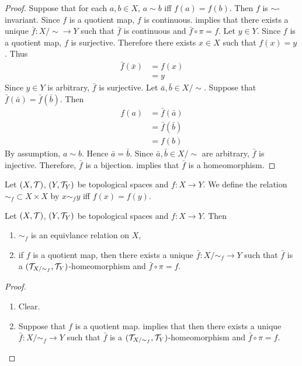 \documentclass{book}
\begin{document}
	\begin{proof}
		Suppose that for each $a, b \in X$, $a \sim b$ iff $f(a) = f(b)$. Then $f$ is ${\sim}$-invariant. Since $f$ is a quotient map, $f$ is continuous.  implies that there exists a unique $\bar{f}: X/{\sim} \rightarrow Y$ such that $\bar{f}$ is continuous and $\bar{f} \circ \pi = f$. 
		Let $y \in Y$. Since $f$ is a quotient map, $f$ is surjective. Therefore there exists $x \in X$ such that $f(x) = y$. Thus 
		\begin{align*}
			\bar{f}(\bar{x}) 
			& = f(x) \\
			& = y 
		\end{align*}
		Since $y \in Y$ is arbitrary, $\bar{f}$ is surjective. Let $\bar{a}, \bar{b} \in X/\sim$. Suppose that $\bar{f}(\bar{a}) = \bar{f}(\bar{b})$. Then 
		\begin{align*}
			f(a)
			& = \bar{f}(\bar{a}) \\
			& = \bar{f}(\bar{b}) \\
			& = f(b)
		\end{align*}
		By assumption, $a \sim b$. Hence $\bar{a} = \bar{b}$. Since $\bar{a}, \bar{b} \in X/\sim$ are arbitrary, $\bar{f}$ is injective. Therefore, $\bar{f}$ is a bijection.  implies that $\bar{f}$ is a homeomorphism.
	\end{proof}
	
	\begin{defn} 
		Let $(X, \mathcal{T})$, $(Y, \mathcal{T}_Y)$ be topological spaces and $f:X \rightarrow Y$. We define the relation ${\sim_f} \subset X \times X$ by $x \sim_f y$ iff $f(x) = f(y)$. 
	\end{defn}
	
	\begin{ex} 
		Let $(X, \mathcal{T})$, $(Y, \mathcal{T}_Y)$ be topological spaces and $f:X \rightarrow Y$. Then 
		\begin{enumerate}
			\item $\sim_f$ is an equivlance relation on $X$,
			\item if $f$ is a quotient map, then there exists a unique $\bar{f}: X/{\sim_f} \rightarrow Y$ such that $\bar{f}$ is a  $(\mathcal{T}_{X/{\sim_f}}, \mathcal{T}_Y)$-homeomorphism and $\bar{f} \circ \pi = f$. 
		\end{enumerate}
	\end{ex}
	
	\begin{proof} \
		\begin{enumerate}
			\item Clear.
			\item Suppose that $f$ is a quotient map.  implies that then there exists a unique $\bar{f}: X/{\sim_f} \rightarrow Y$ such that $\bar{f}$ is a  $(\mathcal{T}_{X/{\sim_f}}, \mathcal{T}_Y)$-homeomorphism and $\bar{f} \circ \pi = f$. 
		\end{enumerate}
	\end{proof}
\end{document}
